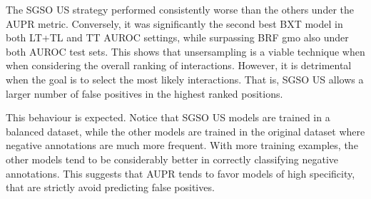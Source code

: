 The SGSO US strategy performed consistently worse than the others under the AUPR metric. Conversely, it was significantly the second best BXT model in both LT+TL and TT AUROC settings, while surpassing BRF gmo also under both AUROC test sets.
This shows that unsersampling is a viable technique when when considering the overall ranking of interactions. However, it is detrimental when the goal is to select the most likely interactions. That is, SGSO US allows a larger number of false positives in the highest ranked positions.

This behaviour is expected. Notice that SGSO US models are trained in a balanced dataset, while the other models are trained in the original dataset where negative annotations are much more frequent. With more training examples, the other models tend to be considerably better in correctly classifying negative annotations. This suggests that AUPR tends to favor models of high specificity, that are strictly avoid predicting false positives.







